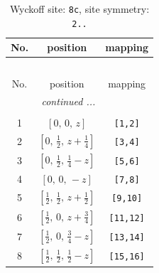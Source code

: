 \documentclass[fleqn,8pt]{jsarticle}
\begin{document}
\renewcommand{\arraystretch}{1.2}
\begin{longtable}{ccc}
\caption{Wyckoff site: {\tt 8c}, site symmetry: {\tt 2..}}
 \\
 \hline \hline
No. & position & mapping \\ \hline \endfirsthead

\multicolumn{2}{l}{\tablename\ \thetable{}} \\
 \hline \hline
No. & position & mapping \\ \hline \endhead

 \hline \hline
\multicolumn{2}{r}{\footnotesize\it continued ...} \\ \endfoot

 \hline \hline
\multicolumn{2}{r}{} \\ \endlastfoot

1 & $\left[ 0,\, 0,\, z \right]$ & {\tt [1,2]} \\ \hline
2 & $\left[ 0,\, \frac{1}{2},\, z + \frac{1}{4} \right]$ & {\tt [3,4]} \\ \hline
3 & $\left[ 0,\, \frac{1}{2},\, \frac{1}{4} - z \right]$ & {\tt [5,6]} \\ \hline
4 & $\left[ 0,\, 0,\, - z \right]$ & {\tt [7,8]} \\ \hline
5 & $\left[ \frac{1}{2},\, \frac{1}{2},\, z + \frac{1}{2} \right]$ & {\tt [9,10]} \\ \hline
6 & $\left[ \frac{1}{2},\, 0,\, z + \frac{3}{4} \right]$ & {\tt [11,12]} \\ \hline
7 & $\left[ \frac{1}{2},\, 0,\, \frac{3}{4} - z \right]$ & {\tt [13,14]} \\ \hline
8 & $\left[ \frac{1}{2},\, \frac{1}{2},\, \frac{1}{2} - z \right]$ & {\tt [15,16]} \\
\end{longtable}
\renewcommand{\arraystretch}{1.2}
\end{document}
